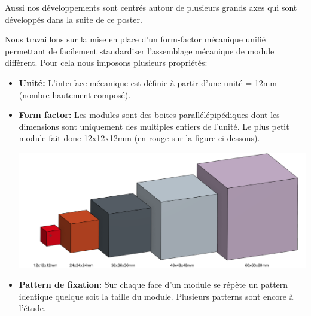 \documentclass[a0,final, portrait]{inriaposter}
\begin{document}
\begin{multicols}{2}
{%

\vspace{-0.5cm}
Aussi nos développements sont centrés autour de plusieurs grands axes qui sont développés dans la suite de ce poster.

}

 {

Nous travaillons sur la mise en place d'un form-factor mécanique unifié permettant de facilement standardiser l'assemblage mécanique de module diffèrent. Pour cela nous imposons plusieurs propriétés:
\begin{itemize}
    \item \textbf{Unité:} L'interface mécanique est définie à partir d'une unité = 12mm (nombre hautement composé).
    \item \textbf{Form factor:} Les modules sont des boites parallélépipédiques dont les dimensions sont uniquement des multiples entiers de l'unité. Le plus petit module fait donc 12x12x12mm (en rouge sur la figure ci-dessous).
    \vspace{-0.5cm}
    \begin{center}
            \includegraphics[width=0.7\columnwidth]{images/module_size.png}
    \end{center}
    \item \textbf{Pattern de fixation:} Sur chaque face d'un module se répète un pattern identique quelque soit la taille du module. Plusieurs patterns sont encore à l'étude.
\end{itemize}

}
\end{multicols}
\end{document}
